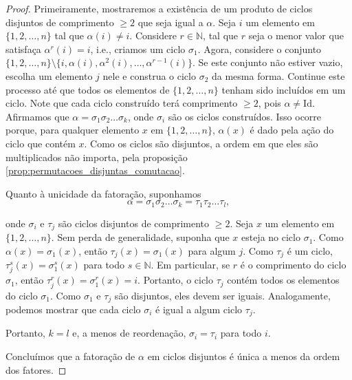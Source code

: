 \documentclass[11pt,openany]{book}
\begin{document}
\begin{proof}
    Primeiramente, mostraremos a existência de um produto de ciclos disjuntos de comprimento $\geq 2$ que seja igual a $\alpha$. 
    Seja $i$ um elemento em $\{1, 2, \ldots, n\}$ tal que $\alpha(i) \neq i$.
    Considere $r \in \mathbb{N}$, tal que $r$ seja o menor valor que satisfaça $\alpha^{r}(i) = i$, i.e., criamos um ciclo $\sigma_1$.
    Agora, considere o conjunto $\{1, 2, \dots, n\} \setminus \{i, \alpha(i), \alpha^2(i), \dots, \alpha^{r-1}(i)\}$. Se este conjunto não estiver vazio, escolha um elemento $j$ nele e construa o ciclo $\sigma_2$ da mesma forma. 
    Continue este processo até que todos os elementos de $\{1, 2, \dots, n\}$ tenham sido incluídos em um ciclo. Note que cada ciclo construído terá comprimento $\geq 2$, pois $\alpha \neq \text{Id}$. Afirmamos que $\alpha = \sigma_1 \sigma_2 \dots \sigma_k$, onde $\sigma_i$ são os ciclos construídos. 
    Isso ocorre porque, para qualquer elemento $x$ em $\{1, 2, \dots, n\}$, $\alpha(x)$ é dado pela ação do ciclo que contém $x$. Como os ciclos são disjuntos, a ordem em que eles são multiplicados não importa, pela proposição \ref{prop:permutacoes_disjuntas_comutacao}.
    
    Quanto à unicidade da fatoração, suponhamos
    \[\alpha = \sigma_1 \sigma_2 \dots \sigma_k = \tau_1 \tau_2 \dots \tau_l,\]

    onde $\sigma_i$ e $\tau_j$ são ciclos disjuntos de comprimento $\geq 2$. 
    Seja $x$ um elemento em $\{1, 2, \dots, n\}$.  Sem perda de generalidade, suponha que $x$ esteja no ciclo $\sigma_1$. 
    Como $\alpha(x) = \sigma_1(x)$, então $\tau_j(x) = \sigma_1(x)$ para algum $j$. 
    Como $\tau_j$ é um ciclo, $\tau_j^s(x) = \sigma_1^s(x)$ para todo $s \in \mathbb{N}$. 
    Em particular, se $r$ é o comprimento do ciclo $\sigma_1$, então $\tau_j^r(x) = \sigma_1^r(x) = i$. 
    Portanto, o ciclo $\tau_j$ contém todos os elementos do ciclo $\sigma_1$. 
    Como $\sigma_1$ e $\tau_j$ são disjuntos, eles devem ser iguais. 
    Analogamente, podemos mostrar que cada ciclo $\sigma_i$ é igual a algum ciclo $\tau_j$. 
    
    Portanto, $k = l$ e, a menos de reordenação, $\sigma_i = \tau_i$ para todo $i$. 

    Concluímos que a fatoração de $\alpha$ em ciclos disjuntos é única a menos da ordem dos fatores.
\end{proof}
\end{document}
